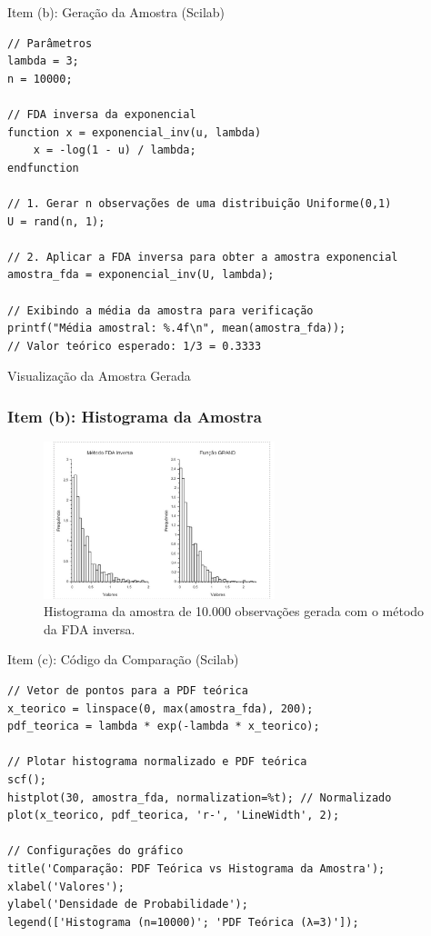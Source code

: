 \begin{frame}[fragile]{Item (b): Geração da Amostra (Scilab)}
\begin{lstlisting}
// Parâmetros
lambda = 3;
n = 10000;

// FDA inversa da exponencial
function x = exponencial_inv(u, lambda)
    x = -log(1 - u) / lambda;
endfunction

// 1. Gerar n observações de uma distribuição Uniforme(0,1)
U = rand(n, 1);

// 2. Aplicar a FDA inversa para obter a amostra exponencial
amostra_fda = exponencial_inv(U, lambda);

// Exibindo a média da amostra para verificação
printf("Média amostral: %.4f\n", mean(amostra_fda));
// Valor teórico esperado: 1/3 = 0.3333
\end{lstlisting}
\end{frame}

\begin{frame}{Visualização da Amostra Gerada}
\frametitle{Item (b): Histograma da Amostra}
\begin{figure}
    \centering
    \includegraphics[width=0.6\textwidth]{figures/FDA_inversa_GRAnd.png}
    \caption{Histograma da amostra de 10.000 observações gerada com o método da FDA inversa.}
    \label{fig:hist_fda}
\end{figure}
\end{frame}

\begin{frame}[fragile]{Item (c): Código da Comparação (Scilab)}
\begin{lstlisting}
// Vetor de pontos para a PDF teórica
x_teorico = linspace(0, max(amostra_fda), 200);
pdf_teorica = lambda * exp(-lambda * x_teorico);

// Plotar histograma normalizado e PDF teórica
scf();
histplot(30, amostra_fda, normalization=%t); // Normalizado
plot(x_teorico, pdf_teorica, 'r-', 'LineWidth', 2);

// Configurações do gráfico
title('Comparação: PDF Teórica vs Histograma da Amostra');
xlabel('Valores');
ylabel('Densidade de Probabilidade');
legend(['Histograma (n=10000)'; 'PDF Teórica (λ=3)']);
\end{lstlisting}
\end{frame}

